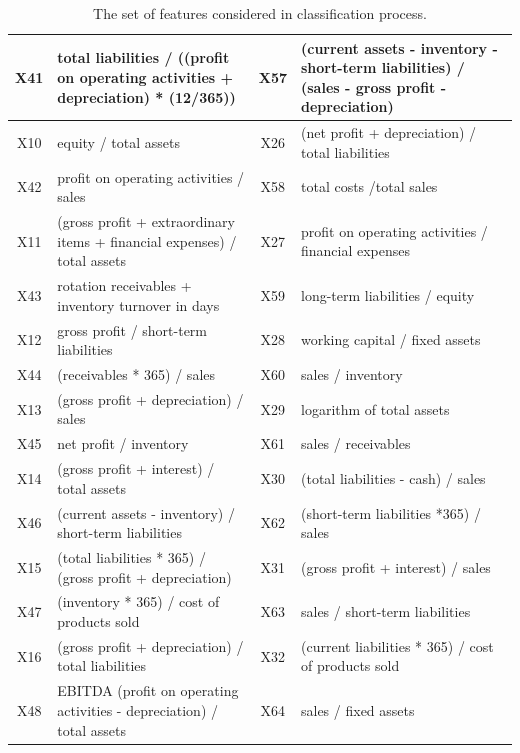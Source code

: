 \begin{table}[H]
\begin{tabular}{|c|p{6cm}|c|p{6cm}|}
\hline
X41 & total liabilities / ((profit on operating activities + depreciation) * (12/365)) & X57 & (current assets - inventory - short-term liabilities) / (sales - gross profit - depreciation) \\
\hline
X10 & equity / total assets & X26 & (net profit + depreciation) / total liabilities \\
\hline
X42 & profit on operating activities / sales & X58 & total costs /total sales \\
\hline
X11 & (gross profit + extraordinary items + financial expenses) / total assets & X27 & profit on operating activities / financial expenses \\
\hline
X43 & rotation receivables + inventory turnover in days & X59 & long-term liabilities / equity \\
\hline
X12 & gross profit / short-term liabilities & X28 & working capital / fixed assets \\
\hline
X44 & (receivables * 365) / sales & X60 & sales / inventory \\
\hline
X13 & (gross profit + depreciation) / sales & X29 & logarithm of total assets \\
\hline
X45 & net profit / inventory & X61 & sales / receivables \\
\hline
X14 & (gross profit + interest) / total assets & X30 & (total liabilities - cash) / sales \\
\hline
X46 & (current assets - inventory) / short-term liabilities & X62 & (short-term liabilities *365) / sales \\
\hline
X15 & (total liabilities * 365) / (gross profit + depreciation) & X31 & (gross profit + interest) / sales \\
\hline
X47 & (inventory * 365) / cost of products sold & X63 & sales / short-term liabilities \\
\hline
X16 & (gross profit + depreciation) / total liabilities & X32 & (current liabilities * 365) / cost of products sold \\
\hline
X48 & EBITDA (profit on operating activities - depreciation) / total assets & X64 & sales / fixed assets \\
\hline
\end{tabular}
\caption{The set of features considered in classification process.}
\end{table}